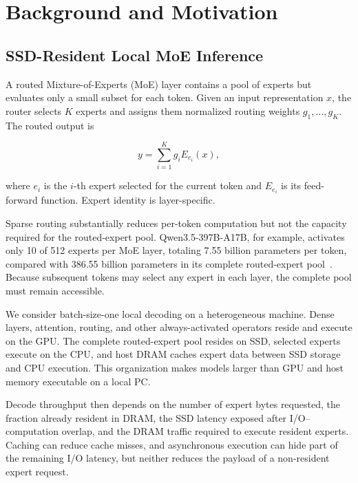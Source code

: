 \documentclass[sigconf, nonacm]{acmart}
\begin{document}
\section{Background and Motivation}

\subsection{SSD-Resident Local MoE Inference}
\label{sec:ssd-resident-moe}

A routed Mixture-of-Experts (MoE) layer contains a pool of experts but
evaluates only a small subset for each token. Given an input
representation \(x\), the router selects \(K\) experts and assigns them
normalized routing weights \(g_1,\ldots,g_K\). The routed output is

\begin{equation}
    y = \sum_{i=1}^{K} g_i E_{e_i}(x),
    \label{eq:routed-output}
\end{equation}

where \(e_i\) is the \(i\)-th expert selected for the current token
and \(E_{e_i}\) is its feed-forward function. Expert identity is
layer-specific.

Sparse routing substantially reduces per-token computation but not the
capacity required for the routed-expert pool.
Qwen3.5-397B-A17B, for example, activates only 10 of 512 experts per
MoE layer, totaling 7.55 billion parameters per token,
compared with 386.55 billion parameters in its complete routed-expert
pool~\cite{qwen35_397b}. Because subsequent tokens may select any expert in each layer,
the complete pool must remain accessible.

We consider batch-size-one local decoding on a heterogeneous machine.
Dense layers, attention, routing, and other always-activated operators
reside and execute on the GPU. The complete routed-expert pool resides
on SSD, selected experts execute on the CPU, and host DRAM caches expert
data between SSD storage and CPU execution. This organization makes
models larger than GPU and host memory executable on a local PC.

Decode throughput then depends on the number of expert bytes requested,
the fraction already resident in DRAM, the SSD latency exposed after
I/O--computation overlap, and the DRAM traffic required to execute
resident experts. Caching can reduce cache misses, and asynchronous
execution can hide part of the remaining I/O latency, but neither
reduces the payload of a non-resident expert request.
\end{document}
